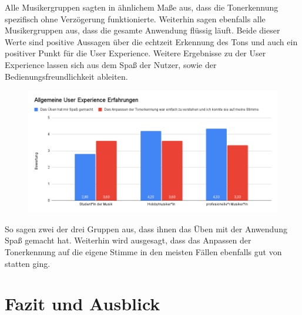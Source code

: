 Alle Musikergruppen sagten in ähnlichem Maße aus, dass die Tonerkennung spezifisch ohne Verzögerung funktionierte. Weiterhin sagen ebenfalls alle Musikergruppen aus, dass die gesamte Anwendung flüssig läuft. Beide dieser Werte sind positive Aussagen über die echtzeit Erkennung des Tons und auch ein positiver Punkt für die User Experience. Weitere Ergebnisse zu der User Experience lassen sich aus dem Spaß der Nutzer, sowie der Bedienungsfreundlichkeit ableiten. 
\begin{figure}[H]
    \centering
    \includegraphics[width=1\textwidth]{Bilder/eval-zufriedenheitUX-vergleich.png}
\end{figure} 
So sagen zwei der drei Gruppen aus, dass ihnen das Üben mit der Anwendung Spaß gemacht hat. Weiterhin wird ausgesagt, dass das Anpassen der Tonerkennung auf die eigene Stimme in den meisten Fällen ebenfalls gut von statten ging. 

\chapter{Fazit und Ausblick}

